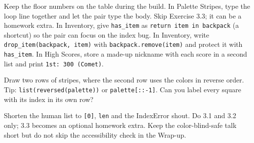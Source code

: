 \begin{differentiation}
\supportpath Keep the floor numbers on the table during the build. In Palette Stripes, type the loop line together and let the
pair type the body. Skip Exercise 3.3; it can be a homework extra. In Inventory, give \texttt{has\_item} as
\texttt{return item in backpack} (a shortcut) so the pair can focus on the index bug.
\extensionpath In Inventory, write \texttt{drop\_item(backpack, item)} with \texttt{backpack.remove(item)} and protect it with
\texttt{has\_item}. In High Scores, store a made-up nickname with each score in a second list and print \texttt{1st: 300 (Comet)}.
\end{differentiation}

\begin{stretchchallenge}
Draw two rows of stripes, where the second row uses the colors in reverse order. Tip: \texttt{list(reversed(palette))} or
\texttt{palette[::-1]}. Can you label every square with its index in its own row?
\end{stretchchallenge}

\begin{teachernote}
Shorten the human list to \texttt{[0]}, \texttt{len} and the IndexError shout. Do 3.1 and 3.2 only; 3.3 becomes an optional homework extra.
Keep the color-blind-safe talk short but do not skip the accessibility check in the Wrap-up.
\end{teachernote}

